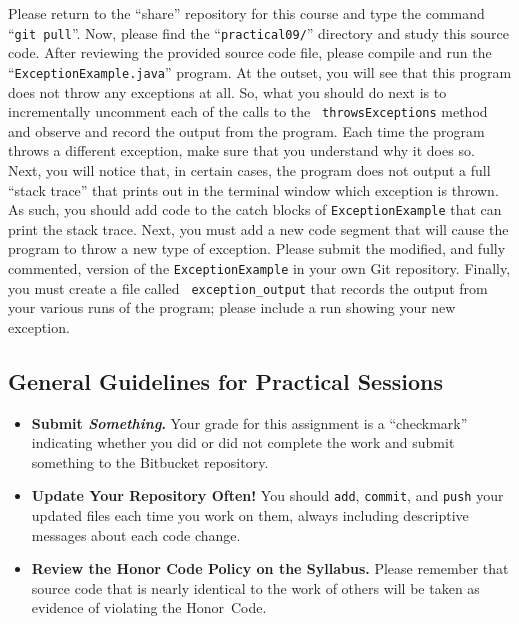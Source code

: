 Please return to the ``share'' repository for this course and type the command ``{\tt git pull}''. Now, please find the
``{\tt practical09/}'' directory and study this source code. After reviewing the provided source code file, please
compile and run the ``{\tt ExceptionExample.java}'' program. At the outset, you will see that this program does not
throw any exceptions at all. So, what you should do next is to incrementally uncomment each of the calls to the {\tt
throwsExceptions} method and observe and record the output from the program. Each time the program throws a different
exception, make sure that you understand why it does so. Next, you will notice that, in certain cases, the program does
not output a full ``stack trace'' that prints out in the terminal window which exception is thrown. As such, you should
add code to the catch blocks of {\tt ExceptionExample} that can print the stack trace. Next, you must add a new code
segment that will cause the program to throw a new type of exception. Please submit the modified, and fully commented,
version of the {\tt ExceptionExample} in your own Git repository. Finally, you must create a file called {\tt
exception\_output} that records the output from your various runs of the program; please include a run showing your new
exception.

\vspace*{-.15in}
\subsection*{General Guidelines for Practical Sessions}
\vspace*{-.05in}

\begin{itemize}
  \itemsep 0in

\item {\bf Submit \textbf{\textit{Something}}.} Your grade for this assignment is a ``checkmark'' indicating whether you
  did or did not complete the work and submit something to the Bitbucket repository.

\item {\bf Update Your Repository Often!} You should {\tt add}, {\tt commit}, and {\tt push} your updated files each
  time you work on them, always including descriptive messages about each code change.

\item {\bf Review the Honor Code Policy on the Syllabus.} Please remember that source code that is nearly identical to
  the work of others will be taken as evidence of violating the \mbox{Honor Code}.

\end{itemize}


